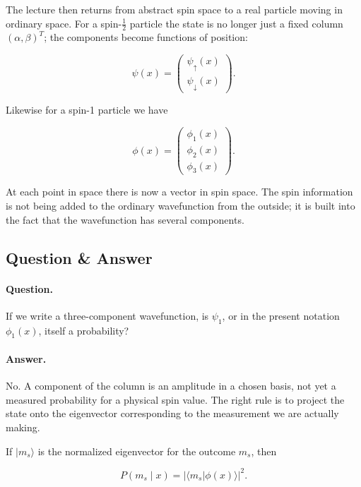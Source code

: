 The lecture then returns from abstract spin space to a real particle moving in ordinary space. For a spin-\(\tfrac12\) particle the state is no longer just a fixed column \((\alpha,\beta)^T\); the components become functions of position:

\begin{equation}
\psi(x)=
\begin{pmatrix}
\psi_\uparrow(x)\\
\psi_\downarrow(x)
\end{pmatrix}.
\end{equation}

Likewise for a spin-1 particle we have

\begin{equation}
\phi(x)=
\begin{pmatrix}
\phi_1(x)\\
\phi_2(x)\\
\phi_3(x)
\end{pmatrix}.
\end{equation}

At each point in space there is now a vector in spin space. The spin information is not being added to the ordinary wavefunction from the outside; it is built into the fact that the wavefunction has several components.

\subsection{Question \& Answer}

\paragraph{Question.} If we write a three-component wavefunction, is \(\psi_1\), or in the present notation \(\phi_1(x)\), itself a probability?

\paragraph{Answer.} No. A component of the column is an amplitude in a chosen basis, not yet a measured probability for a physical spin value. The right rule is to project the state onto the eigenvector corresponding to the measurement we are actually making.

If \(|m_s\rangle\) is the normalized eigenvector for the outcome \(m_s\), then

\begin{equation}
P(m_s\mid x)=|\langle m_s|\phi(x)\rangle|^2.
\end{equation}

